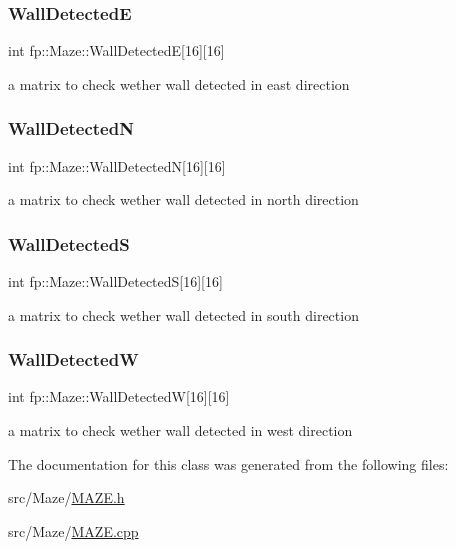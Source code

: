 \subsubsection{\texorpdfstring{Wall\+DetectedE}{WallDetectedE}}
{\footnotesize\ttfamily int fp\+::\+Maze\+::\+Wall\+DetectedE\mbox{[}16\mbox{]}\mbox{[}16\mbox{]}\hspace{0.3cm}{\ttfamily [protected]}}

a matrix to check wether wall detected in east direction \mbox{\label{classfp_1_1_maze_aa3538c38fcd8c6cddf3046ec3a33ab2e}} 
\subsubsection{\texorpdfstring{Wall\+DetectedN}{WallDetectedN}}
{\footnotesize\ttfamily int fp\+::\+Maze\+::\+Wall\+DetectedN\mbox{[}16\mbox{]}\mbox{[}16\mbox{]}\hspace{0.3cm}{\ttfamily [protected]}}

a matrix to check wether wall detected in north direction \mbox{\label{classfp_1_1_maze_a856f8a1002fdad16684454cb6006646a}} 
\subsubsection{\texorpdfstring{Wall\+DetectedS}{WallDetectedS}}
{\footnotesize\ttfamily int fp\+::\+Maze\+::\+Wall\+DetectedS\mbox{[}16\mbox{]}\mbox{[}16\mbox{]}\hspace{0.3cm}{\ttfamily [protected]}}

a matrix to check wether wall detected in south direction \mbox{\label{classfp_1_1_maze_ad93e8c8272e3b2f9f693238a95dc38c1}} 
\subsubsection{\texorpdfstring{Wall\+DetectedW}{WallDetectedW}}
{\footnotesize\ttfamily int fp\+::\+Maze\+::\+Wall\+DetectedW\mbox{[}16\mbox{]}\mbox{[}16\mbox{]}\hspace{0.3cm}{\ttfamily [protected]}}

a matrix to check wether wall detected in west direction 

The documentation for this class was generated from the following files\+:\begin{DoxyCompactItemize}
\item 
src/\+Maze/\hyperlink{_m_a_z_e_8h}{M\+A\+Z\+E.\+h}\item 
src/\+Maze/\hyperlink{_m_a_z_e_8cpp}{M\+A\+Z\+E.\+cpp}\end{DoxyCompactItemize}
